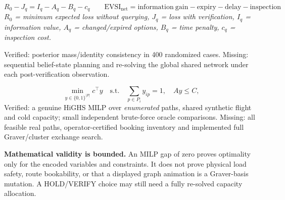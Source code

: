 \documentclass[10pt,a4paper]{article}
\newcommand{\subsect}[1]{\vspace{3mm}{\large\sffamily\bfseries #1}\par\vspace{1mm}}
\newcommand{\methodnote}[1]{{\footnotesize\color{muted}\textit{#1}}\par}
\begin{document}
\subsect{Model II / Value of verification}
\[
\boxed{R_0-J_q=I_q-A_q-B_q-c_q}\qquad
\boxed{\mathrm{EVSI}_{\mathrm{net}}=\mathrm{information\ gain}-\mathrm{expiry}-\mathrm{delay}-\mathrm{inspection}}
\]
\methodnote{$R_0$ = minimum expected loss without querying, $J_q$ = loss with verification, $I_q$ = information value, $A_q$ = changed/expired options, $B_q$ = time penalty, $c_q$ = inspection cost.}
Verified: posterior mass/identity consistency in 400 randomized cases. Missing: sequential belief-state planning and re-solving the global shared network under each post-verification observation.\par
\subsect{Model III / Joint capacity-constrained routing}
\[
\min_{y\in\{0,1\}^{|P|}}c^\top y \quad\text{s.t.}\quad
\sum_{p\in P_i}y_{ip}=1,\quad Ay\le C,
\]
Verified: a genuine HiGHS MILP over \emph{enumerated} paths, shared synthetic flight and cold capacity; small independent brute-force oracle comparisons. Missing: all feasible real paths, operator-certified booking inventory and implemented full Graver/cluster exchange search.\par
\begin{caution}
\textbf{Mathematical validity is bounded.} An MILP gap of zero proves optimality only for the encoded variables and constraints. It does not prove physical load safety, route bookability, or that a displayed graph animation is a Graver-basis mutation. A HOLD/VERIFY choice may still need a fully re-solved capacity allocation.
\end{caution}
\newpage
\end{document}
